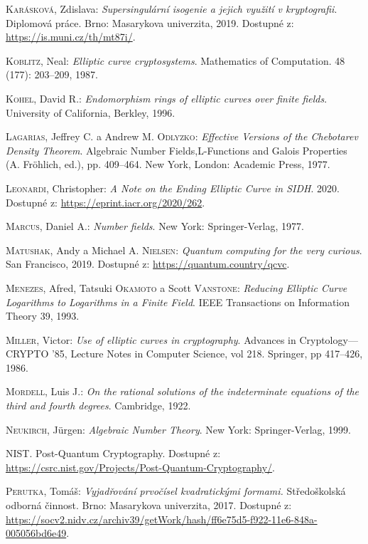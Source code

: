 \documentclass[12pt]{report}
\begin{document}
\begin{thebibliography}{97}
\textsc{Karásková}, Zdislava: \textit{Supersingulární isogenie a jejich využití v kryptografii}. Diplomová práce. Brno: Masarykova univerzita, 2019. Dostupné z: \url{https://is.muni.cz/th/mt87i/}.

\textsc{Koblitz}, Neal: \textit{Elliptic curve cryptosystems}. Mathematics of Computation. 48 (177): 203–209, 1987.

\textsc{Kohel}, David R.: \textit{Endomorphism rings of elliptic curves over finite fields}. University of California, Berkley, 1996.

\textsc{Lagarias}, Jeffrey C. a Andrew M. \textsc{Odlyzko}: \textit{Effective Versions of the Chebotarev Density Theorem}. Algebraic Number Fields,L-Functions and Galois Properties (A. Fröhlich, ed.), pp. 409–464. New York, London: Academic Press, 1977.

\textsc{Leonardi}, Christopher: \textit{A Note on the Ending Elliptic Curve in SIDH}. 2020. Dostupné z: \url{https://eprint.iacr.org/2020/262}.

\textsc{Marcus}, Daniel A.: \textit{Number fields}. New York: Springer-Verlag, 1977.

\textsc{Matushak}, Andy a Michael A. \textsc{Nielsen}: \textit{Quantum computing for the very curious}. San Francisco, 2019. Dostupné z: \url{https://quantum.country/qcvc}.

\textsc{Menezes}, Afred, Tatsuki \textsc{Okamoto} a Scott \textsc{Vanstone}: \textit{Reducing Elliptic Curve Logarithms to Logarithms in a Finite Field}. IEEE Transactions on Information Theory 39, 1993.

\textsc{Miller}, Victor: \textit{Use of elliptic curves in cryptography}. Advances in Cryptology—CRYPTO ’85, Lecture Notes in Computer Science, vol 218. Springer, pp 417–426, 1986.

\textsc{Mordell}, Luis J.: \textit{On the rational solutions of the indeterminate equations of the third and fourth degrees}. Cambridge, 1922.

\textsc{Neukirch}, J{\"u}rgen: \textit{Algebraic Number Theory}. New York: Springer-Verlag, 1999.

\textsc{NIST}. Post-Quantum Cryptography. Dostupné z: \url{https://csrc.nist.gov/Projects/Post-Quantum-Cryptography/}.

\textsc{Perutka}, Tomáš: \textit{Vyjadřování prvočísel kvadratickými formami.} Středoškolská odborná činnost. Brno: Masarykova univerzita, 2017. Dostupné z: \url{https://socv2.nidv.cz/archiv39/getWork/hash/ff6e75d5-f922-11e6-848a-005056bd6e49}.


\end{thebibliography}
\end{document}

